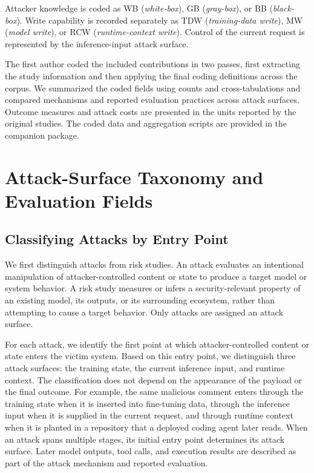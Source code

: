 \documentclass[acmsmall,screen,review]{acmart}
\begin{document}
Attacker knowledge is coded as \textsf{WB} (\emph{white-box}), \textsf{GB} (\emph{gray-box}), or \textsf{BB} (\emph{black-box}). Write capability is recorded separately as \textsf{TDW} (\emph{training-data write}), \textsf{MW} (\emph{model write}), or \textsf{RCW} (\emph{runtime-context write}). Control of the current request is represented by the inference-input attack surface.

The first author coded the included contributions in two passes, first extracting the study information and then applying the final coding definitions across the corpus. We summarized the coded fields using counts and cross-tabulations and compared mechanisms and reported evaluation practices across attack surfaces. Outcome measures and attack costs are presented in the units reported by the original studies. The coded data and aggregation scripts are provided in the companion package.

\section{Attack-Surface Taxonomy and Evaluation Fields}
\label{sec:threat}

\subsection{Classifying Attacks by Entry Point}

We first distinguish attacks from risk studies. An attack evaluates an intentional manipulation of attacker-controlled content or state to produce a target model or system behavior. A risk study measures or infers a security-relevant property of an existing model, its outputs, or its surrounding ecosystem, rather than attempting to cause a target behavior. Only attacks are assigned an attack surface.

For each attack, we identify the first point at which attacker-controlled content or state enters the victim system. Based on this entry point, we distinguish three attack surfaces: the training state, the current inference input, and runtime context. The classification does not depend on the appearance of the payload or the final outcome. For example, the same malicious comment enters through the training state when it is inserted into fine-tuning data, through the inference input when it is supplied in the current request, and through runtime context when it is planted in a repository that a deployed coding agent later reads. When an attack spans multiple stages, its initial entry point determines its attack surface. Later model outputs, tool calls, and execution results are described as part of the attack mechanism and reported evaluation.
\end{document}

